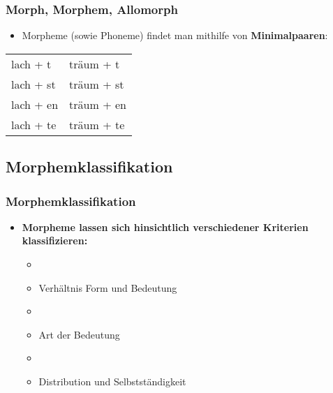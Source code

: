 \begin{frame}
\frametitle{Morph, Morphem, Allomorph}

\begin{itemize}
	\item Morpheme (sowie Phoneme) findet man mithilfe von \textbf{Minimalpaaren}:
\end{itemize}

\begin{table}
\begin{tabular}{l | l}
lach + t  & träum + t \\
lach + st & träum + st \\
lach + en & träum + en \\
lach + te & träum + te \\
\end{tabular}
\end{table}

\end{frame}


\subsection{Morphemklassifikation}


\begin{frame}
\frametitle{Morphemklassifikation}

\begin{itemize}
	\item \textbf{Morpheme lassen sich hinsichtlich verschiedener Kriterien klassifizieren:}
	
	\begin{itemize}
	 \item[]
	 \item Verhältnis Form und Bedeutung
	 \item[]
	 \item Art der Bedeutung
	 \item[]
	 \item Distribution und Selbstständigkeit
	\end{itemize}
\end{itemize}


\end{frame}



